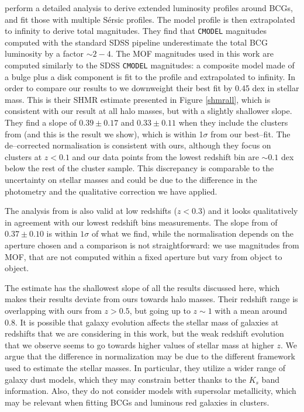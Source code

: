 {\citet{kravtsov} perform a detailed analysis to derive extended luminosity profiles around BCGs, and fit those with multiple S\'ersic profiles. The model profile is then extrapolated to infinity to derive total magnitudes. They find that \texttt{CMODEL} magnitudes computed with the standard SDSS pipeline underestimate the total BCG luminosity by a factor $\sim 2-4$. The MOF magnitudes used in this work are computed similarly to the SDSS \texttt{CMODEL} magnitudes: a composite model made of a bulge plus a disk component is fit to the profile and extrapolated to infinity. In order to compare our results to \citet{kravtsov} we downweight their best fit by 0.45 dex in stellar mass. This is their SHMR estimate presented in Figure \ref{shmrall}, which is consistent with our result  at all halo masses, but with a slightly shallower slope. They find a slope of $0.39\pm0.17$ and $0.33\pm0.11$ when they include the clusters from \citet{gonzalez} (and this is the result we show), which is within 1$\sigma$ from our best--fit. The de--corrected normalisation is consistent with ours, although they focus on clusters at $z<0.1$ and our data points from the lowest redshift bin are $\sim 0.1$ dex below the rest of the cluster sample. This discrepancy is comparable to the uncertainty on stellar masses and could be due to the difference in the photometry and the qualitative correction we have applied. %

The analysis from \citet{zu} is also valid at low redshifts ($z<0.3$) and it looks qualitatively in agreement with our lowest redshift bins measurements. The slope from \citet{icl} of $0.37\pm 0.10$ is within $1\sigma$ of what we find, while the normalisation depends on the aperture chosen and a comparison is not straightforward: we use magnitudes from MOF, that are not computed within a fixed aperture but vary from object to object. 

The \citet{coupon} estimate has the shallowest slope of all the results discussed here, which makes their results deviate from ours towards halo masses. Their redshift range is overlapping with ours from $z>0.5$, but going up to $z\sim 1$ with a mean around 0.8. It is possible that galaxy evolution affects the stellar mass of galaxies at redshifts that we are considering in this work, but the weak redshift evolution that we observe seems to go towards higher values of stellar mass at higher $z$. We argue that the difference in normalization may be due to the different framework used to estimate the stellar masses. In particular, they utilize a wider range of galaxy dust models, which they may constrain better thanks to the $K_s$ band information. Also, they do not consider models with supersolar metallicity, which may be relevant when fitting BCGs and luminous red galaxies in clusters. 

}

